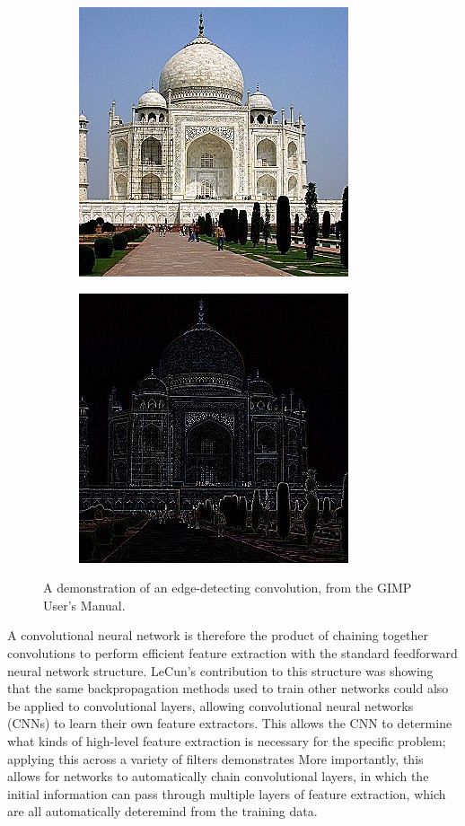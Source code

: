 \begin{figure}[!htb]
  \begin{subfigure}{0.5\textwidth}
    \centering
    \includegraphics{images/gimp_original}
  \end{subfigure}%
  \begin{subfigure}{0.5\textwidth}
    \centering
    \includegraphics{images/gimp_edgedetect}
  \end{subfigure}

  \caption{A demonstration of an edge-detecting convolution, from the GIMP User's Manual. \cite{gimpconvolution}}
  \label{fig:gimp_edge}
\end{figure}

A convolutional neural network is therefore the product of chaining together convolutions to perform efficient feature extraction with the standard feedforward neural network structure.
LeCun's contribution to this structure was showing that the same backpropagation methods used to train other networks could also be applied to convolutional layers, allowing convolutional neural networks (CNNs) to learn their own feature extractors.
This allows the CNN to determine what kinds of high-level feature extraction is necessary for the specific problem; applying this across a variety of filters demonstrates 
More importantly, this allows for networks to automatically chain convolutional layers, in which the initial information can pass through multiple layers of feature extraction, which are all automatically deteremind from the training data.

